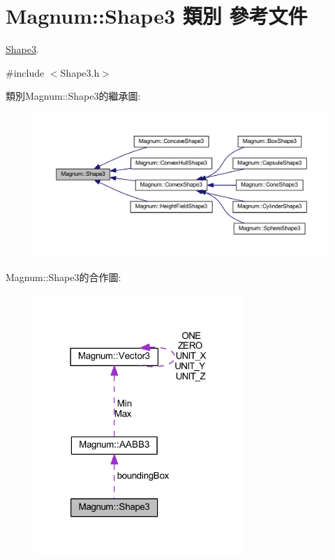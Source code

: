 \hypertarget{class_magnum_1_1_shape3}{}\section{Magnum\+:\+:Shape3 類別 參考文件}
\label{class_magnum_1_1_shape3}


\hyperlink{class_magnum_1_1_shape3}{Shape3}.  




{\ttfamily \#include $<$Shape3.\+h$>$}



類別\+Magnum\+:\+:Shape3的繼承圖\+:\nopagebreak
\begin{figure}[H]
\begin{center}
\leavevmode
\includegraphics[width=350pt]{class_magnum_1_1_shape3__inherit__graph}
\end{center}
\end{figure}


Magnum\+:\+:Shape3的合作圖\+:\nopagebreak
\begin{figure}[H]
\begin{center}
\leavevmode
\includegraphics[width=226pt]{class_magnum_1_1_shape3__coll__graph}
\end{center}
\end{figure}

